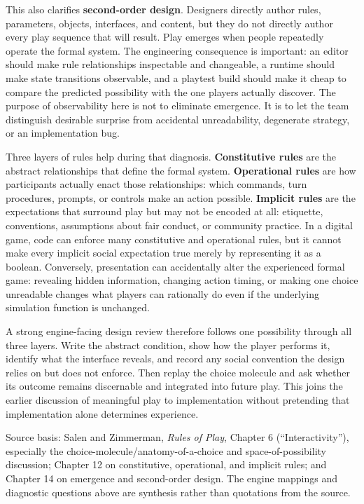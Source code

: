 This also clarifies \textbf{second-order design}. Designers directly author rules, parameters, objects, interfaces, and content, but they do not directly author every play sequence that will result. Play emerges when people repeatedly operate the formal system. The engineering consequence is important: an editor should make rule relationships inspectable and changeable, a runtime should make state transitions observable, and a playtest build should make it cheap to compare the predicted possibility with the one players actually discover. The purpose of observability here is not to eliminate emergence. It is to let the team distinguish desirable surprise from accidental unreadability, degenerate strategy, or an implementation bug.

Three layers of rules help during that diagnosis. \textbf{Constitutive rules} are the abstract relationships that define the formal system. \textbf{Operational rules} are how participants actually enact those relationships: which commands, turn procedures, prompts, or controls make an action possible. \textbf{Implicit rules} are the expectations that surround play but may not be encoded at all: etiquette, conventions, assumptions about fair conduct, or community practice. In a digital game, code can enforce many constitutive and operational rules, but it cannot make every implicit social expectation true merely by representing it as a boolean. Conversely, presentation can accidentally alter the experienced formal game: revealing hidden information, changing action timing, or making one choice unreadable changes what players can rationally do even if the underlying simulation function is unchanged.

A strong engine-facing design review therefore follows one possibility through all three layers. Write the abstract condition, show how the player performs it, identify what the interface reveals, and record any social convention the design relies on but does not enforce. Then replay the choice molecule and ask whether its outcome remains discernable and integrated into future play. This joins the earlier discussion of meaningful play to implementation without pretending that implementation alone determines experience.

Source basis: Salen and Zimmerman, \emph{Rules of Play}, Chapter 6 (``Interactivity''), especially the choice-molecule/anatomy-of-a-choice and space-of-possibility discussion; Chapter 12 on constitutive, operational, and implicit rules; and Chapter 14 on emergence and second-order design. The engine mappings and diagnostic questions above are synthesis rather than quotations from the source.

